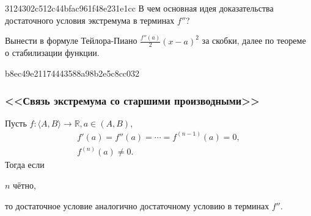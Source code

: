 \begin{note}{3124302c512c44bfac961f48e231e1cc}
    В чем основная идея доказательства достаточного условия экстремума в терминах \( f'' \)?

    \begin{cloze}{1}
        Вынести в формуле Тейлора-Пиано \( \frac{f''(a)}{2} (x - a)^2  \) за скобки, далее по теореме о стабилизации функции.
    \end{cloze}
\end{note}


\begin{note}{b8ec49e21174443588a98b2e5c8cc032}
    \subsubsection{<<Связь экстремума со старшими производными>>}

    Пусть \( f : \langle A, B \rangle \to \mathbb R, a \in (A, B) \),
    \[
        \begin{gathered}
            f'(a) = f''(a) = \cdots = f^{(n - 1)}(a) = 0, \\
            f^{(n)}(a) \neq 0.
        \end{gathered}
    \]
    Тогда если \begin{icloze}{2}\( n \) чётно,\end{icloze} \begin{icloze}{1}то достаточное условие аналогично достаточному условию в терминах \( f'' \).\end{icloze}
\end{note}

